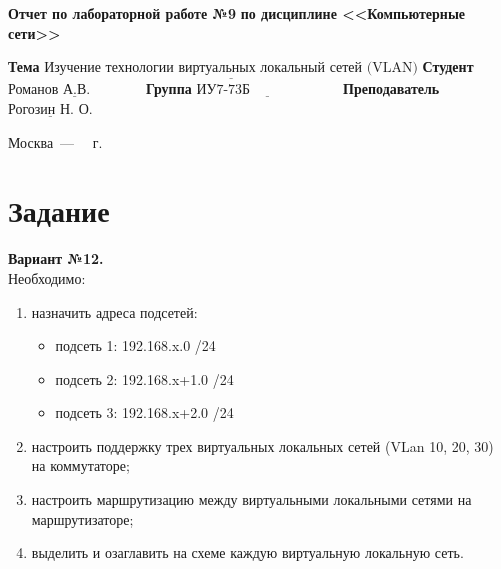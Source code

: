 \documentclass[12pt]{report}
\begin{document}
\begin{titlepage}
		\begin{center}
			\noindent\begin{minipage}{1.1\textwidth}\centering
				\Large\textbf{  Отчет по лабораторной работе №9}\newline
				\textbf{по дисциплине <<Компьютерные сети>>}\newline\newline\newline
			\end{minipage}
		\end{center}
		
		\noindent\textbf{Тема} $\underline{\text{
		Изучение технологии виртуальных локальный сетей (VLAN)}}$\newline\newline
		\noindent\textbf{Студент} $\underline{\text{Романов А.В.~~~~~~~~~~~}}$\newline\newline
		\noindent\textbf{Группа} $\underline{\text{ИУ7-73Б~~~~~~~~~~~~~~~~~~~}}$\newline\newline
		\noindent\textbf{Преподаватель} $\underline{\text{Рогозин Н. О.}}$\newline\newline\newline
		
		\begin{center}
			\vfill
			Москва~---~\the\year
			~г.
		\end{center}
	\end{titlepage}


\section*{Задание}

\textbf{Вариант №12.}\\

Необходимо:

\begin{enumerate}
	\item назначить адреса подсетей:
	\begin{itemize}
		\item подсеть 1: 192.168.x.0 /24
		\item подсеть 2: 192.168.x+1.0 /24
		\item подсеть 3: 192.168.x+2.0 /24
	\end{itemize}
	\item настроить поддержку трех виртуальных локальных сетей (VLan 10, 20, 30) на коммутаторе;
	\item настроить маршрутизацию между виртуальными локальными сетями на маршрутизаторе;
	\item выделить и озаглавить на схеме каждую виртуальную локальную сеть.
\end{enumerate}
\end{document}
